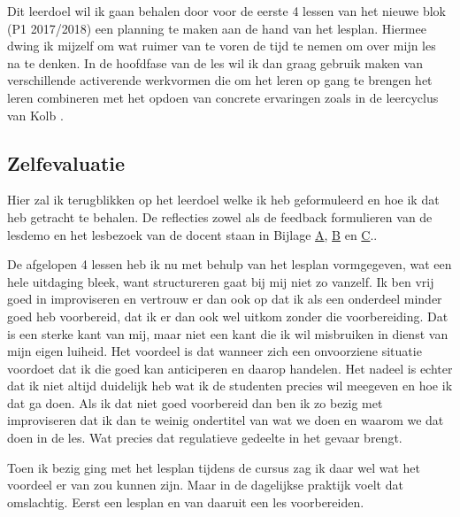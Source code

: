 Dit leerdoel wil ik gaan behalen door voor de eerste 4 lessen van het nieuwe blok (P1 2017/2018) een planning te maken aan de hand van het lesplan. Hiermee dwing ik mijzelf om wat ruimer van te voren de tijd te nemen om over mijn les na te denken. In de hoofdfase van de les wil ik dan graag gebruik maken van verschillende activerende werkvormen die om het leren op gang te brengen het leren combineren met het opdoen van concrete ervaringen zoals in de leercyclus van Kolb \cite[p.143-145]{kallenberg2014leren}. 

\subsection{Zelfevaluatie}
\label{sec:zelfevaluatie}
Hier zal ik terugblikken op het leerdoel welke ik heb geformuleerd en hoe ik dat heb getracht te behalen. De reflecties zowel als de feedback formulieren van de lesdemo en het lesbezoek van de docent staan in Bijlage \hyperref[sec:lesdemo]{A}, \hyperref[sec:lesbezoek]{B} en \hyperref[sec:lesbezoekcollega]{C}..

De afgelopen 4 lessen heb ik nu met behulp van het lesplan vormgegeven, wat een hele uitdaging bleek, want structureren gaat bij mij niet zo vanzelf. Ik ben vrij goed in improviseren en vertrouw er dan ook op dat ik als een onderdeel minder goed heb voorbereid, dat ik er dan ook wel uitkom zonder die voorbereiding. Dat is een sterke kant van mij, maar niet een kant die ik wil misbruiken in dienst van mijn eigen luiheid. Het voordeel is dat wanneer zich een onvoorziene situatie voordoet dat ik die goed kan anticiperen en daarop handelen. Het nadeel is echter dat ik niet altijd duidelijk heb wat ik de studenten precies wil meegeven en hoe ik dat ga doen.
Als ik dat niet goed voorbereid dan ben ik zo bezig met improviseren dat ik dan te weinig ondertitel van wat we doen en waarom we dat doen in de les. Wat precies dat regulatieve gedeelte in het gevaar brengt.

Toen ik bezig ging met het lesplan tijdens de cursus zag ik daar wel wat het voordeel er van zou kunnen zijn. Maar in de dagelijkse praktijk voelt dat omslachtig. Eerst een lesplan en van daaruit een les voorbereiden.

